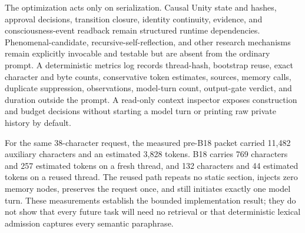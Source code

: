 \documentclass[10pt,twocolumn]{article}
\theoremstyle{definition}
\theoremstyle{plain}
\theoremstyle{remark}
\begin{document}
The optimization acts only on serialization.  Causal Unity state and hashes, approval decisions, transition closure, identity continuity, evidence, and consciousness-event readback remain structured runtime dependencies.  Phenomenal-candidate, recursive-self-reflection, and other research mechanisms remain explicitly invocable and testable but are absent from the ordinary prompt.  A deterministic metrics log records thread-hash, bootstrap reuse, exact character and byte counts, conservative token estimates, sources, memory calls, duplicate suppression, observations, model-turn count, output-gate verdict, and duration outside the prompt.  A read-only context inspector exposes construction and budget decisions without starting a model turn or printing raw private history by default.

For the same 38-character request, the measured pre-B18 packet carried 11,482 auxiliary characters and an estimated 3,828 tokens.  B18 carries 769 characters and 257 estimated tokens on a fresh thread, and 132 characters and 44 estimated tokens on a reused thread.  The reused path repeats no static section, injects zero memory nodes, preserves the request once, and still initiates exactly one model turn.  These measurements establish the bounded implementation result; they do not show that every future task will need no retrieval or that deterministic lexical admission captures every semantic paraphrase.
\end{document}
